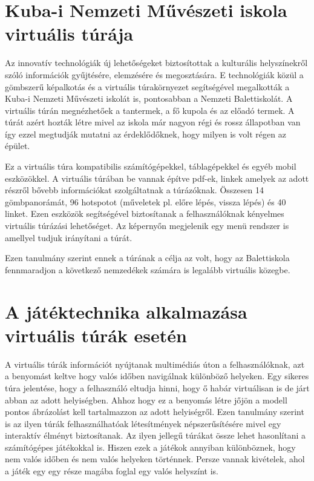 \section{Kuba-i Nemzeti Művészeti iskola virtuális túrája}

Az innovatív technológiák új lehetőségeket biztosítottak a kulturális helyszínekről szóló információk gyűjtésére, elemzésére és megosztására. E technológiák közül a gömbszerű képalkotás és a virtuális túrakörnyezet segítségével megalkották a Kuba-i Nemzeti Művészeti iskolát \cite{napolitano2017virtual} is, pontosabban a Nemzeti Balettiskolát. A virtuális túrán megnézhetőek a tantermek, a fő kupola és az előadó termek. A túrát azért hozták létre mivel az iskola már nagyon régi és rossz állapotban van így ezzel megtudják mutatni az érdeklődőknek, hogy milyen is volt régen az épület.

Ez a virtuális túra kompatibilis számítógépekkel, táblagépekkel és egyéb mobil eszközökkel. A virtuális túrában be vannak építve pdf-ek, linkek amelyek az adott részről bővebb információkat szolgáltatnak a túrázóknak. Összesen 14 gömbpanorámát, 96 hotspotot (műveletek pl. előre lépés, vissza lépés) és 40 linket. Ezen eszközök segítségével biztosítanak a felhasználóknak kényelmes virtuális túrázási lehetőséget. Az képernyőn megjelenik egy menü rendszer is amellyel tudjuk irányítani a túrát.

Ezen tanulmány szerint ennek a túrának a célja az volt, hogy az Balettiskola fennmaradjon a következő nemzedékek számára is legalább virtuális közegbe. 

\section{A játéktechnika alkalmazása virtuális túrák esetén}

A virtuális túrák információt nyújtanak multimédiás úton a felhasználóknak, azt a benyomást keltve hogy valós időben navigálnak különböző helyeken. Egy sikeres túra jelentése, hogy a felhasználó eltudja hinni, hogy ő habár virtuálisan is de járt abban az adott helyiségben. Ahhoz hogy ez a benyomás létre jőjön a modell pontos ábrázolást kell tartalmazzon az adott helyiségről. Ezen tanulmány szerint is az ilyen túrák felhasználhatóak létesítmények népszerűsítésére mivel egy interaktív élményt biztosítanak. Az ilyen jellegű túrákat össze lehet hasonlítani a számítógépes játékokkal is. Hiszen ezek a játékok annyiban különböznek, hogy nem valós időben és nem valós helyeken történnek. Persze vannak kivételek, ahol a játék egy egy része magába foglal egy valós helyszínt is. 

